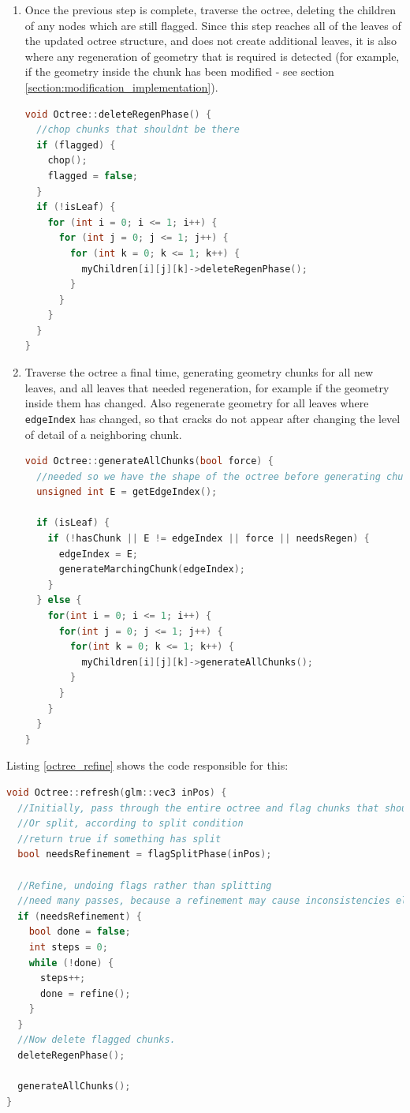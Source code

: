 \documentclass{article}
\begin{document}
\begin{enumerate}
  \item Once the previous step is complete, traverse the octree, deleting the children of any nodes which are still flagged. Since this step reaches all of the leaves of the updated octree structure, and does not create additional leaves, it is also where any regeneration of geometry that is required is detected (for example, if the geometry inside the chunk has been modified - see section \ref{section:modification_implementation}).
  \begin{lstlisting}[language=C++,label={deleteregenphase},caption={The third stage in the octree refinement process, \texttt{deleteRegenPhase}}]
void Octree::deleteRegenPhase() {
  //chop chunks that shouldnt be there
  if (flagged) {
    chop();
    flagged = false;
  }
  if (!isLeaf) {
    for (int i = 0; i <= 1; i++) {
      for (int j = 0; j <= 1; j++) {
        for (int k = 0; k <= 1; k++) {
          myChildren[i][j][k]->deleteRegenPhase();
        }
      }
    }
  }  
}
  \end{lstlisting}
  \item Traverse the octree a final time, generating geometry chunks for all new leaves, and all leaves that needed regeneration, for example if the geometry inside them has changed. Also regenerate geometry for all leaves where \texttt{edgeIndex} has changed, so that cracks do not appear after changing the level of detail of a neighboring chunk.
  \begin{lstlisting}[language=C++,label={generateallchunks},caption={The fourth stage in the octree refinement process, \texttt{generateAllChunks}}]
void Octree::generateAllChunks(bool force) {
  //needed so we have the shape of the octree before generating chunks that rely on it
  unsigned int E = getEdgeIndex();

  if (isLeaf) {
    if (!hasChunk || E != edgeIndex || force || needsRegen) {
      edgeIndex = E;
      generateMarchingChunk(edgeIndex);
    }
  } else {
    for(int i = 0; i <= 1; i++) {
      for(int j = 0; j <= 1; j++) {
        for(int k = 0; k <= 1; k++) {
          myChildren[i][j][k]->generateAllChunks();
        }
      }
    }
  }
}
  \end{lstlisting}
\end{enumerate}
Listing \ref{octree_refine} shows the code responsible for this:
\begin{lstlisting}[language=C++,label={octree_refine},caption={Code showing the order of steps in the octree refinement process}]
void Octree::refresh(glm::vec3 inPos) {
  //Initially, pass through the entire octree and flag chunks that should be deleted, according to the chop condition
  //Or split, according to split condition
  //return true if something has split
  bool needsRefinement = flagSplitPhase(inPos);

  //Refine, undoing flags rather than splitting
  //need many passes, because a refinement may cause inconsistencies elsewhere
  if (needsRefinement) {
    bool done = false;
    int steps = 0;
    while (!done) {
      steps++;
      done = refine();
    }
  }
  //Now delete flagged chunks.
  deleteRegenPhase();

  generateAllChunks();
}
\end{lstlisting}
\end{document}
